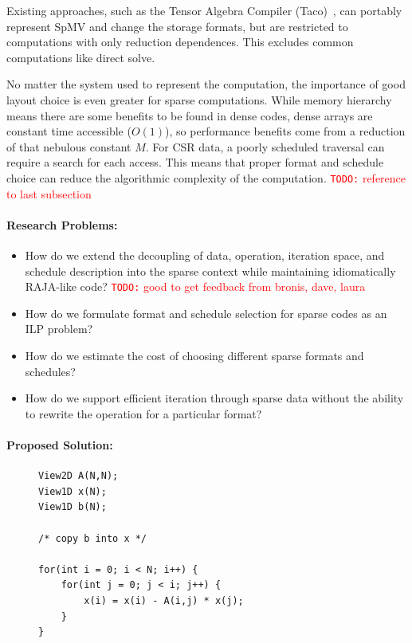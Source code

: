 \documentclass{article}
\newcommand{\todo}[1]{{\textcolor{red}{{\tt{TODO:}}\,\,#1 }}}
\begin{document}
Existing approaches, such as the Tensor Algebra Compiler (Taco)~\cite{kjolstad2017tensor}, can portably represent SpMV and change the storage formats, but are restricted to computations with only reduction dependences.
This excludes common computations like direct solve.

No matter the system used to represent the computation, the importance of good layout choice is even greater for sparse computations.
While memory hierarchy means there are some benefits to be found in dense codes, dense arrays are constant time accessible ($O(1)$), so performance benefits come from a reduction of that nebulous constant $M$.
For CSR data, a poorly scheduled traversal can require a search for each access.
This means that proper format and schedule choice can reduce the algorithmic complexity of the computation.
\todo{reference to last subsection}


\paragraph{Research Problems:}
\begin{itemize}
    \item How do we extend the decoupling of data, operation, iteration space, and schedule description into the sparse context while maintaining idiomatically RAJA-like code? \todo{good to get feedback from bronis, dave, laura}
    \item How do we formulate format and schedule selection for sparse codes as an ILP problem?
    \item How do we estimate the cost of choosing different sparse formats and schedules?
    \item How do we support efficient iteration through sparse data without the ability to rewrite the operation for a particular format? 
\end{itemize}


\paragraph{Proposed Solution:}


\begin{figure}
\begin{lstlisting}[label={ForwardSolveC},caption={C-like implementation of forward substitution using Views}]
View2D A(N,N);
View1D x(N);
View1D b(N);

/* copy b into x */

for(int i = 0; i < N; i++) {
    for(int j = 0; j < i; j++) {
        x(i) = x(i) - A(i,j) * x(j);
    }
}
\end{lstlisting}
\end{figure}
\end{document}
